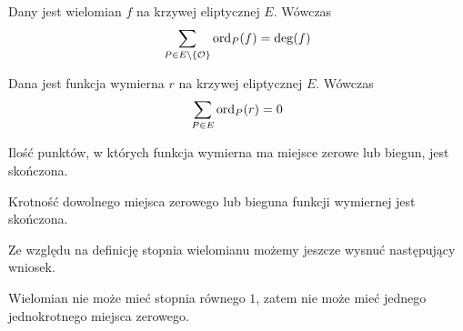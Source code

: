 \begin{theorem}
Dany jest wielomian $f$ na krzywej eliptycznej $E$.
Wówczas
\begin{equation*}
\sum_{P \in E\setminus \{\mathcal{O}\}} \operatorname{ord}_P(f) = \deg(f)
\end{equation*}
\end{theorem}

\begin{corollary}\label{function_order_sum_zero_corollary}
Dana jest funkcja wymierna $r$ na krzywej eliptycznej $E$. Wówczas
\begin{equation*}
\sum_{P \in E} \operatorname{ord}_P(r) = 0
\end{equation*}
\end{corollary}

\begin{corollary}
Ilość punktów, w których funkcja wymierna ma miejsce zerowe lub biegun,
jest skończona.
\end{corollary}

\begin{corollary}
Krotność dowolnego miejsca zerowego lub bieguna funkcji wymiernej
jest skończona.
\end{corollary}

Ze względu na definicję stopnia wielomianu
możemy jeszcze wysnuć następujący wniosek.

\begin{corollary}\label{poly_no_single_zero_corollary}
Wielomian nie może mieć stopnia równego $1$,
zatem nie może mieć jednego jednokrotnego miejsca zerowego.
\end{corollary}

